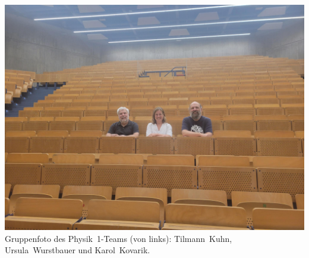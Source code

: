 \begin{center}
\includegraphics[width=\columnwidth, height=0.35\textheight]{res/ProfsWS2025.jpg}\\
\smallskip
Gruppenfoto des Physik~1-Teams (von links): Tilmann~Kuhn, Ursula~Wurstbauer und Karol~Kovarik.
\end{center}










\newpage

